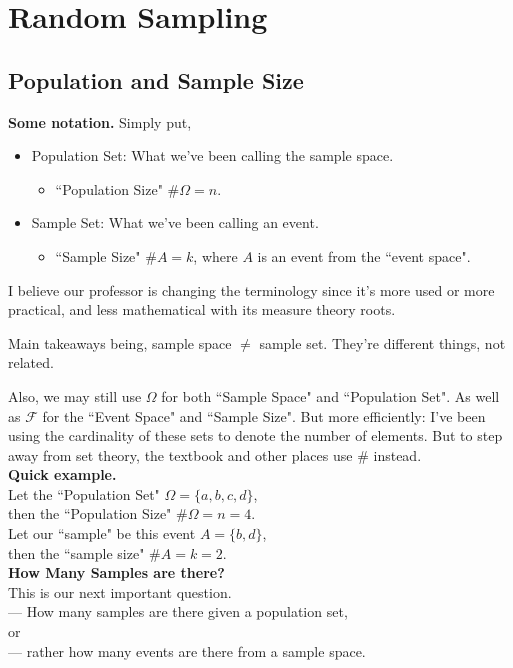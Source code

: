 \documentclass[12pt]{book}
\begin{document}
\section{Random Sampling }
\subsection{Population and Sample Size}

\textbf{Some notation. }
Simply put, 
\begin{itemize}
\item Population Set: What we've been calling the sample space.
	\begin{itemize}\item``Population Size" $\# \Omega = n$.\end{itemize}
\item Sample Set: What we've been calling an event.
	\begin{itemize}\item``Sample Size" $\# A = k$, where $A$ is an event from the ``event space".\end{itemize}
\end{itemize}

I believe our professor is changing the terminology since it's more used or more practical, and less mathematical with its measure theory roots.

Main takeaways being, sample space $\neq$ sample set. They're different things, not related.

Also, we may still use $\Omega$ for both ``Sample Space" and ``Population Set".
As well as $\mathcal{F}$ for the ``Event Space" and ``Sample Size".
But more efficiently: I've been using the cardinality of these sets to denote the number of elements. But to step away from set theory, the textbook and other places use $\#$ instead.\\

\noindent \textbf{Quick example.}\\
Let the ``Population Set" $\Omega=\{a,b,c,d\}$,\\
then the ``Population Size" $\# \Omega = n = 4$.\\

\noindent Let our ``sample" be this event $A = \{b,d\}$,\\
then the ``sample size" $\# A = k = 2$.\\

\noindent \textbf{How Many Samples are there?}\\
This is our next important question. \\
--- How many samples are there given a population set, \\
or \\
--- rather how many events are there from a sample space.\\
\end{document}
